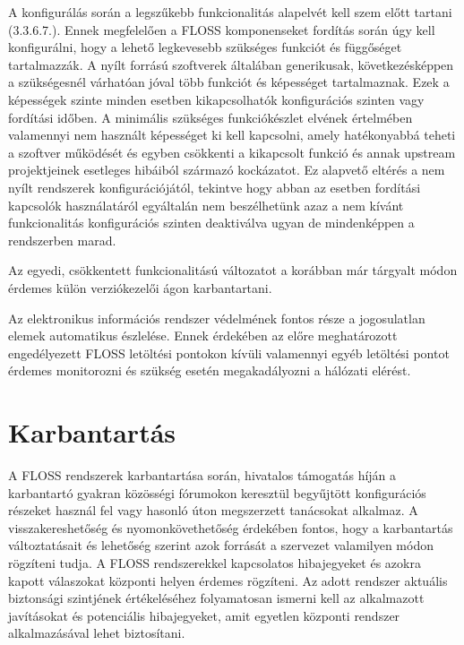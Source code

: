 \documentclass[12pt,magyar,a4paper,oneside]{scrreprt}
\begin{document}
A konfigurálás során a legszűkebb funkcionalitás alapelvét kell szem
előtt tartani (3.3.6.7.). Ennek megfelelően a FLOSS komponenseket
fordítás során úgy kell konfigurálni, hogy a lehető legkevesebb
szükséges funkciót és függőséget tartalmazzák. A nyílt forrású
szoftverek általában generikusak, következésképpen a szükségesnél
várhatóan jóval több funkciót és képességet tartalmaznak. Ezek a
képességek szinte minden esetben kikapcsolhatók konfigurációs szinten
vagy fordítási időben. A minimális szükséges funkciókészlet elvének
értelmében valamennyi nem használt képességet ki kell kapcsolni, amely
hatékonyabbá teheti a szoftver működését és egyben csökkenti a
kikapcsolt funkció és annak upstream projektjeinek esetleges hibáiból
származó kockázatot. Ez alapvető eltérés a nem nyílt rendszerek
konfigurációjától, tekintve hogy abban az esetben fordítási kapcsolók
használatáról egyáltalán nem beszélhetünk azaz a nem kívánt
funkcionalitás konfigurációs szinten deaktiválva ugyan de mindenképpen a
rendszerben marad.

Az egyedi, csökkentett funkcionalitású változatot a korábban már
tárgyalt módon érdemes külön verziókezelői ágon karbantartani.

Az elektronikus információs rendszer védelmének fontos része a
jogosulatlan elemek automatikus észlelése. Ennek érdekében az előre
meghatározott engedélyezett FLOSS letöltési pontokon kívüli valamennyi
egyéb letöltési pontot érdemes monitorozni és szükség esetén
megakadályozni a hálózati elérést.

\hypertarget{karbantartuxe1s}{%
\section{Karbantartás}\label{karbantartuxe1s}}

A FLOSS rendszerek karbantartása során, hivatalos támogatás híján a
karbantartó gyakran közösségi fórumokon keresztül begyűjtött
konfigurációs részeket használ fel vagy hasonló úton megszerzett
tanácsokat alkalmaz. A visszakereshetőség és nyomonkövethetőség
érdekében fontos, hogy a karbantartás változtatásait és lehetőség
szerint azok forrását a szervezet valamilyen módon rögzíteni tudja. A
FLOSS rendszerekkel kapcsolatos hibajegyeket és azokra kapott válaszokat
központi helyen érdemes rögzíteni. Az adott rendszer aktuális biztonsági
szintjének értékeléséhez folyamatosan ismerni kell az alkalmazott
javításokat és potenciális hibajegyeket, amit egyetlen központi rendszer
alkalmazásával lehet biztosítani.
\end{document}
